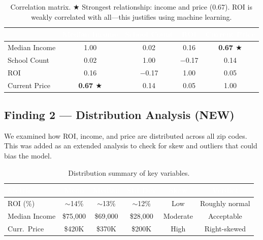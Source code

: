 \documentclass[12pt, a4paper]{article}
\newcommand{\hrow}{\rowcolor{rowblue}}
\begin{document}
\begin{table}[H]
\centering
\renewcommand{\arraystretch}{1.4}
\begin{tabular}{lcccc}
\toprule
\rowcolor{headerblue}
& \textcolor{white}{\textbf{Median Income}} &
  \textcolor{white}{\textbf{School Count}} &
  \textcolor{white}{\textbf{ROI}} &
  \textcolor{white}{\textbf{Current Price}} \\
\midrule
Median Income  & 1.00 & 0.02 & 0.16 & \textbf{0.67 $\bigstar$} \\
\hrow School Count   & 0.02 & 1.00 & $-$0.17 & 0.14 \\
ROI            & 0.16 & $-$0.17 & 1.00 & 0.05 \\
\hrow Current Price  & \textbf{0.67 $\bigstar$} & 0.14 & 0.05 & 1.00 \\
\bottomrule
\end{tabular}
\caption{Correlation matrix. $\bigstar$ Strongest relationship: income and price (0.67). ROI is weakly correlated with all---this justifies using machine learning.}
\end{table}

\subsection*{Finding 2 --- Distribution Analysis \textnormal{(NEW)}}

We examined how ROI, income, and price are distributed across all zip codes. This was added as an extended
analysis to check for skew and outliers that could bias the model.

\begin{table}[H]
\centering
\renewcommand{\arraystretch}{1.4}
\begin{tabular}{lccccc}
\toprule
\rowcolor{headerblue}
\textcolor{white}{\textbf{Metric}} &
\textcolor{white}{\textbf{Mean}} &
\textcolor{white}{\textbf{Median}} &
\textcolor{white}{\textbf{Std Dev}} &
\textcolor{white}{\textbf{Skew}} &
\textcolor{white}{\textbf{Verdict}} \\
\midrule
ROI (\%)       & $\sim$14\%   & $\sim$13\%  & $\sim$12\%  & Low      & Roughly normal \\
\hrow Median Income  & \$75,000     & \$69,000    & \$28,000    & Moderate & Acceptable \\
Curr.\ Price   & \$420K       & \$370K      & \$200K      & High     & Right-skewed \\
\bottomrule
\end{tabular}
\caption{Distribution summary of key variables.}
\end{table}
\end{document}
